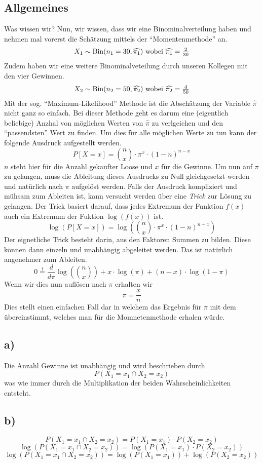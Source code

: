 \subsection*{Allgemeines}
Was wissen wir? Nun, wir wissen, dass wir eine Binominalverteilung haben
und nehmen mal vorerst die Schätzung mittels der ``Momentenmethode'' an. 
\[X_1 \sim \text{Bin}(n_1=30, \widehat{\pi_1})$ 
  wobei $\widehat{\pi_1} = \frac{2}{30}\]
Zudem haben wir eine weitere Binominalveteilung durch unseren Kollegen mit
den vier Gewinnen.
\[X_2 \sim \text{Bin}(n_2=50, \widehat{\pi_2})$ 
  wobei $\widehat{\pi_2} = \frac{4}{50}\]
Mit der sog. ``Maximum-Likelihood'' Methode ist die Abschätzung der
Variable $\widehat{\pi}$ nicht ganz so einfach. Bei dieser Methode geht
es darum eine (eigentlich beliebige) Anzhal von möglichen Werten von 
$\widehat{\pi}$ zu verlgeichen und den ``passendsten'' Wert zu finden.
Um dies für alle möglichen Werte zu tun kann der folgende Ausdruck aufgestellt
werden.
\[  P[X=x] = {n \choose x} \cdot \pi^x \cdot (1-n)^{n-x} \]
$n$ steht hier für die Anzahl gekaufter Loose und $x$ für die Gewinne.
Um nun auf $\pi$ zu gelangen, muss die Ableitung dieses Ausdrucks zu Null
gleichgesetzt werden und natürlich nach $\pi$ aufgelöst werden.
Falls der Ausdruck kompliziert und mühsam zum Ableiten ist, kann versucht 
werden über eine \emph{Trick} zur Lösung zu gelangen. Der Trick basiert
darauf, dass jedes Extremum der Funktion $f(x)$ auch ein Extremum der 
Fuktion $\log(f(x))$ ist.
\[ \log\left(P[X=x]\right) = 
   \log\left({n \choose x} \cdot \pi^x \cdot (1-n)^{n-x}\right) \]
Der eignetliche Trick besteht darin, aus den Faktoren Summen zu bilden.
Diese können dann einzeln und unabhängig abgeleitet werden. Das ist natürlich
angenehmer zum Ableiten.
\[ 0 \stackrel{!}{=} \frac{d}{d\pi} \log\left( {n \choose x} \right) +
   x \cdot \log( \pi ) + (n-x)\cdot \log(1-\pi) \]
Wenn wir dies nun auflösen nach $\pi$ erhalten wir
\[ \pi = \frac{x}{n} \]
Dies stellt einen einfachen Fall dar in welchem das Ergebnis für $\pi$
mit dem übereinstimmt, welches man für die Momnetenmethode erhalen würde.

\subsection*{a)}
Die Anzahl Gewinne ist unabhängig und wird beschrieben durch
\[ P(X_1 = x_1 \cap X_2 = x_2 ) \]
was wie immer durch die Multiplikation der beiden Wahrscheinlichkeiten
entsteht.

\subsection*{b)}
\[ P(X_1 = x_1 \cap X_2 = x_2 ) =  P(X_1 = x_1) \cdot P(X_2=x_2)\]
\[ \log(P(X_1=x_1 \cap X_2=x_2)) = \log( P(X_1 = x_1) \cdot P(X_2=x_2)) \]
\[ \log(P(X_1=x_1 \cap X_2=x_2)) = \log( P(X_1 = x_1)) + \log(P(X_2=x_2)) \]


